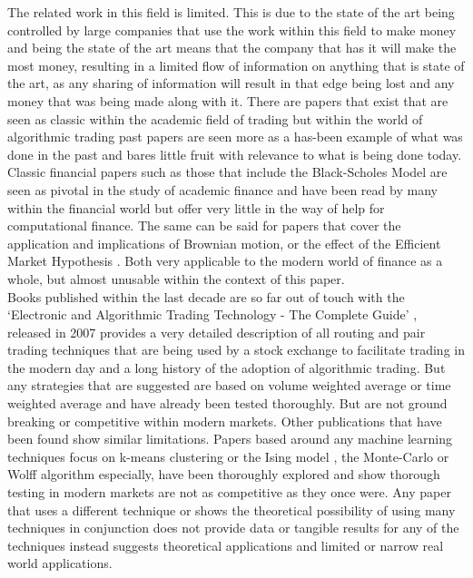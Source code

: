 \documentclass[12pt,a4paper]{article}
\begin{document}
The related work in this field is limited. This is due to the state of the art being controlled by large companies that use the work within this field to make money and being the state of the art means that the company that has it will make the most money, resulting in a limited flow of information on anything that is state of the art, as any sharing of information will result in that edge being lost and any money that was being made along with it. There are papers that exist that are seen as classic within the academic field of trading but within the world of algorithmic trading past papers are seen more as a has-been example of what was done in the past and bares little fruit with relevance to what is being done today. \\

Classic financial papers such as those that include the Black-Scholes Model \cite{Saad2015} are seen as pivotal in the study of academic finance and have been read by many within the financial world but offer very little in the way of help for computational finance. The same can be said for papers that cover the application and implications of Brownian motion, or the effect of the Efficient Market Hypothesis \cite{Meng2016}. Both very applicable to the modern world of finance as a whole, but almost unusable within the context of this paper. \\

Books published within the last decade are so far out of touch with the `Electronic and Algorithmic Trading Technology - The Complete Guide' \cite{Kim2007}, released in 2007 provides a very detailed description of all routing and pair trading techniques that are being used by a stock exchange to facilitate trading in the modern day and a long history of the adoption of algorithmic trading. But any strategies that are suggested are based on volume weighted average or time weighted average and have already been tested thoroughly. But are not ground breaking or competitive within modern markets. Other publications that have been found show similar limitations. Papers based around any machine learning techniques focus on k-means clustering \cite{Gerlein2016} or the Ising model \cite{Lima2017}, the Monte-Carlo or Wolff algorithm especially, have been thoroughly explored and show thorough testing in modern markets are not as competitive as they once were. Any paper that uses a different technique or shows the theoretical possibility of using many techniques in conjunction does not provide data or tangible results for any of the techniques instead suggests theoretical applications and limited or narrow real world applications.\\
\end{document}
